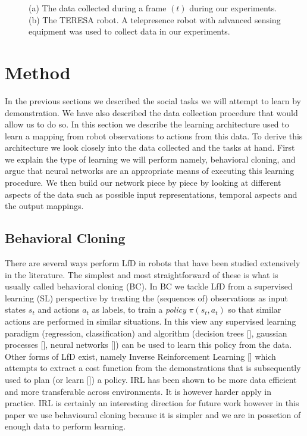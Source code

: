 \documentclass[letterpaper, 10 pt, conference]{ieeeconf}
\begin{document}
\begin{figure}[tbh]
\begin{subfigure}[b]{0.35\columnwidth}
    \caption{}
       \label{fig:robot}
  \end{subfigure} 
  \caption{(a) The data collected during a frame $(t)$ during our experiments.  (b) The TERESA robot. A telepresence robot with advanced sensing equipment was used to collect data in our experiments.}

    \vspace{-2mm}
  \label{fig:data_robot}
  \end{figure}

\section{Method}
In the previous sections we described the social tasks we will attempt to learn by demonstration. We have also described the data collection procedure that would allow us to do so. In this section we describe the learning architecture used to learn a mapping from robot observations to actions from this data. To derive this architecture we look closely into the data collected and the tasks at hand.
First we explain the type of learning we will perform namely, behavioral cloning, and argue that neural networks are an appropriate means of executing this learning procedure. We then build our network piece by piece by looking at different aspects of the data such as possible input representations, temporal aspects and the output mappings. 

\subsection{Behavioral Cloning}
There are several ways perform LfD in robots that have been studied extensively in the literature. The simplest and most straightforward of these is what is usually called behavioral cloning (BC). In BC we tackle LfD from a supervised learning (SL) perspective by treating the (sequences of) observations as input states $s_t$ and actions $a_t$ as labels, to train a \emph{policy} $\pi(s_t,a_t)$ so that similar actions are performed in similar situations. In this view any supervised learning paradigm (regression, classification) and algorithm (decision trees [], gaussian processes [], neural networks []) can be used to learn this policy from the data. Other forms of LfD exist, namely Inverse Reinforcement Learning [] which attempts to extract a cost function from the demonstrations that is subsequently used to plan (or learn []) a policy. IRL has been shown to be more data efficient and more transferable across environments. It is however harder apply in practice. IRL is certainly an interesting direction for future work however in this paper we use behavioural cloning because it is simpler and we are in possetion of enough data to perform learning.
\end{document}
